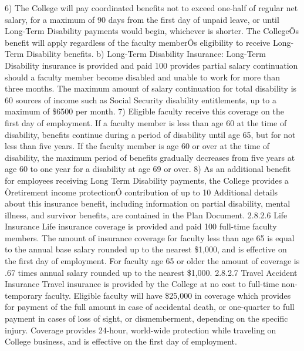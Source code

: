 \documentclass[letterpaper, 11pt]{article}
\begin{document}
6) The College will pay coordinated benefits not to exceed one-half of regular net salary, for a maximum of 90 days from the first day of unpaid leave, or until Long-Term Disability payments would begin, whichever is shorter.  The CollegeÕs benefit will apply regardless of the faculty memberÕs eligibility to receive Long-Term Disability benefits.
b) Long-Term Disability Insurance:  Long-Term Disability insurance is provided
and paid 100%
provides partial salary continuation should a faculty member become disabled and
unable to work for more than three months.  The maximum amount of salary
continuation for total disability is 60%
sources of income such as Social Security disability entitlements, up to a
maximum of \$6500 per month.
7) Eligible faculty receive this coverage on the first day of employment.  If a faculty member is less than age 60 at the time of disability, benefits continue during a period of disability until age 65, but for not less than five years.  If the faculty member is age 60 or over at the time of disability, the maximum period of benefits gradually decreases from five years at age 60 to one year for a disability at age 69 or over.
8) As an additional benefit for employees receiving Long Term Disability payments, the College provides a Òretirement income protectionÓ contribution of up to 10%
   Additional details about this insurance benefit, including information on partial disability, mental illness, and survivor benefits, are contained in the Plan Document.
2.8.2.6 Life Insurance
   Life insurance coverage is provided and paid 100%
   full-time faculty members.  The amount of insurance coverage for faculty less
   than age 65 is equal to the annual base salary rounded up to the nearest
   \$1,000, and is effective on the first day of employment.  For faculty age 65
   or older the amount of coverage is .67 times annual salary rounded up to the
   nearest \$1,000.
2.8.2.7 Travel Accident Insurance
   Travel insurance is provided by the College at no cost to full-time
   non-temporary faculty.  Eligible faculty will have \$25,000 in coverage which provides for payment of the full amount in case of accidental death, or one-quarter to full payment in cases of loss of sight, or dismemberment, depending on the specific injury.  Coverage provides 24-hour, world-wide protection while traveling on College business, and is effective on the first day of employment.
\end{document}
